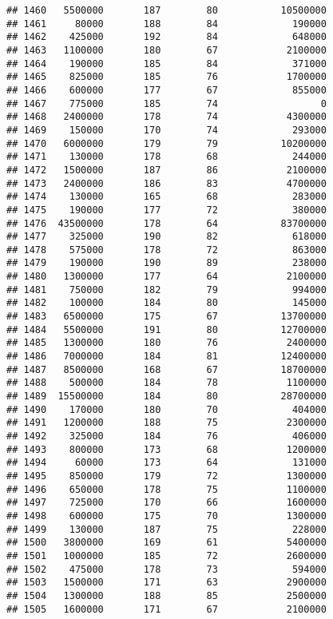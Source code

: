 \documentclass[
]{article}
\begin{document}
\begin{verbatim}
## 1460   5500000       187        80           10500000
## 1461     80000       188        84             190000
## 1462    425000       192        84             648000
## 1463   1100000       180        67            2100000
## 1464    190000       185        84             371000
## 1465    825000       185        76            1700000
## 1466    600000       177        67             855000
## 1467    775000       185        74                  0
## 1468   2400000       178        74            4300000
## 1469    150000       170        74             293000
## 1470   6000000       179        79           10200000
## 1471    130000       178        68             244000
## 1472   1500000       187        86            2100000
## 1473   2400000       186        83            4700000
## 1474    130000       165        68             283000
## 1475    190000       177        72             380000
## 1476  43500000       178        64           83700000
## 1477    325000       190        82             618000
## 1478    575000       178        72             863000
## 1479    190000       190        89             238000
## 1480   1300000       177        64            2100000
## 1481    750000       182        79             994000
## 1482    100000       184        80             145000
## 1483   6500000       175        67           13700000
## 1484   5500000       191        80           12700000
## 1485   1300000       180        76            2400000
## 1486   7000000       184        81           12400000
## 1487   8500000       168        67           18700000
## 1488    500000       184        78            1100000
## 1489  15500000       184        80           28700000
## 1490    170000       180        70             404000
## 1491   1200000       188        75            2300000
## 1492    325000       184        76             406000
## 1493    800000       173        68            1200000
## 1494     60000       173        64             131000
## 1495    850000       179        72            1300000
## 1496    650000       178        75            1100000
## 1497    725000       170        66            1600000
## 1498    600000       175        70            1300000
## 1499    130000       187        75             228000
## 1500   3800000       169        61            5400000
## 1501   1000000       185        72            2600000
## 1502    475000       178        73             594000
## 1503   1500000       171        63            2900000
## 1504   1300000       188        85            2500000
## 1505   1600000       171        67            2100000

\end{verbatim}
\end{document}
